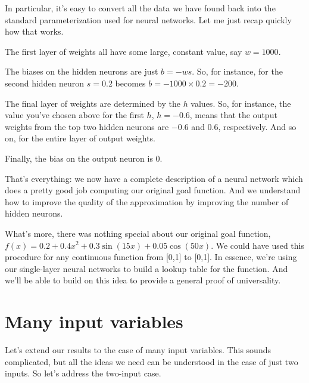 \documentclass[a4paper,twoside,10pt]{book}
\begin{document}
In particular, it's easy to convert all the data we have found back into the standard parameterization used for neural networks. Let me just recap quickly how that works.

The first layer of weights all have some large, constant value, say $w=1000$.

The biases on the hidden neurons are just $b=-ws$. So, for instance, for the second hidden neuron $s=0.2$ becomes $b=-1000\times0.2=-200$.

The final layer of weights are determined by the $h$ values. So, for instance, the value you've chosen above for the first $h$, $h= -0.6$, means that the output weights from the top two hidden neurons are $-0.6$ and 0.6, respectively. And so on, for the entire layer of output weights.

Finally, the bias on the output neuron is 0.

That's everything: we now have a complete description of a neural network which does a pretty good job computing our original goal function. And we understand how to improve the quality of the approximation by improving the number of hidden neurons.

What's more, there was nothing special about our original goal function, $f(x)=0.2+0.4x^2+0.3\sin(15x)+0.05\cos(50x)$. We could have used this procedure for any continuous function from [0,1] to [0,1]. In essence, we're using our single-layer neural networks to build a lookup table for the function. And we'll be able to build on this idea to provide a general proof of universality.

\section{Many input variables}
Let's extend our results to the case of many input variables. This sounds complicated, but all the ideas we need can be understood in the case of just two inputs. So let's address the two-input case.
\end{document}
